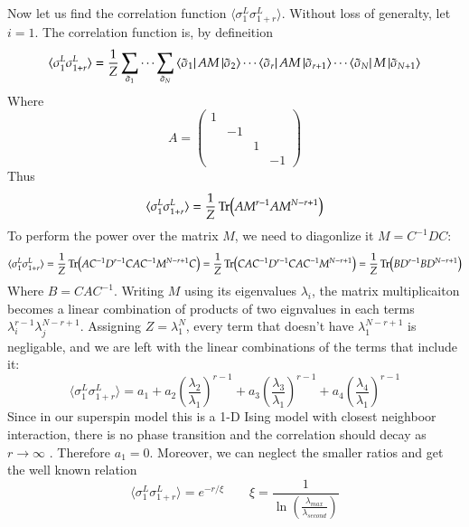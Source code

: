 \documentclass{article}
\begin{document}
Now let us find the correlation function $\langle\sigma_1^L \sigma^L_{1+r}\rangle$. Without loss of generalty, let $i=1$. The correlation function is, by defineition
\begin{equation}
    \langle\sigma_1^L \sigma^L_{1+r}\rangle = \frac{1}{Z} \sum_{\tilde{\sigma}_1} \cdots \sum_{\tilde{\sigma}_N} \bra{\tilde{\sigma}_1}AM\ket{\tilde{\sigma}_{2}}\cdots\bra{\tilde{\sigma}_{r}}AM\ket{\tilde{\sigma}_{r+1}}\cdots\bra{\tilde{\sigma}_N}M\ket{\tilde{\sigma}_{N+1}}
\end{equation}
Where
\begin{equation}
    A = \begin{pmatrix}
        1 & & & \\
        & -1 & & \\
        & & 1 & \\
        & & & -1
    \end{pmatrix}
\end{equation}
Thus
\begin{equation}
    \langle\sigma_1^L \sigma^L_{1+r}\rangle = \frac{1}{Z} \Tr(AM^{r-1}AM^{N-r+1})
\end{equation}
To perform the power over the matrix $M$, we need to diagonlize it $M = C^{-1}DC$:
\begin{equation}
    \langle\sigma_1^L \sigma^L_{1+r}\rangle = \frac{1}{Z} \Tr(AC^{-1}D^{r-1}CAC^{-1}M^{N-r+1}C) = \frac{1}{Z} \Tr(CAC^{-1}D^{r-1}CAC^{-1}M^{N-r+1}) = \frac{1}{Z} \Tr(BD^{r-1}BD^{N-r+1})
\end{equation}
Where $B = CAC^{-1}$. Writing $M$ using its eigenvalues $\lambda_i$, the matrix multiplicaiton becomes a linear combination of products of two eignvalues in each terms $\lambda_i^{r-1} \lambda_j^{N-r+1}$. Assigning $Z = \lambda_1^N$, every term that doesn't have $\lambda_1^{N-r+1}$ is negligable, and we are left with the linear combinations of the terms that include it:
\begin{equation}
    \langle\sigma_1^L \sigma^L_{1+r}\rangle = a_1 + a_2 \left(\frac{\lambda_2}{\lambda_1}\right)^{r-1} + a_3 \left(\frac{\lambda_3}{\lambda_1}\right)^{r-1} + a_4 \left(\frac{\lambda_4}{\lambda_1}\right)^{r-1}
\end{equation}
Since in our superspin model this is a 1-D Ising model with closest neighboor interaction, there is no phase transition and the correlation should decay as $r\rightarrow\infty$ . Therefore $a_1 = 0$. Moreover, we can neglect the smaller ratios and get the well known relation
\begin{equation}
    \langle\sigma_1^L \sigma^L_{1+r}\rangle = e^{-r/\xi} \qquad \xi = \frac{1}{\ln\left(\frac{\lambda_{max}}{\lambda_{second}}\right)}
\end{equation}
\end{document}
